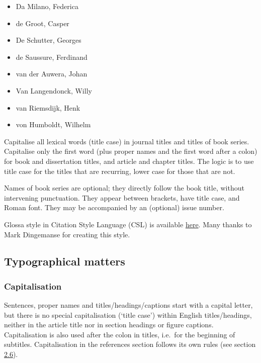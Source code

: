 \documentclass[]{glossa}
\begin{document}
\begin{itemize}
\item
  Da Milano, Federica
\item
  de Groot, Casper
\item
  De Schutter, Georges
\item
  de Saussure, Ferdinand
\item
  van der Auwera, Johan
\item
  Van Langendonck, Willy
\item
  van Riemsdijk, Henk
\item
  von Humboldt, Wilhelm
\end{itemize}

Capitalise all lexical words (title case) in journal titles and titles
of book series. Capitalise only the first word (plus proper names and
the first word after a colon) for book and dissertation titles, and
article and chapter titles. The logic is to use title case for the
titles that are recurring, lower case for those that are not.

Names of book series are optional; they directly follow the book title,
without intervening punctuation. They appear between brackets, have
title case, and Roman font. They may be accompanied by an (optional)
issue number.

Glossa style in Citation Style Language (CSL) is available
\href{https://www.zotero.org/styles?q=Glossa}{here}. Many thanks to Mark
Dingemanse for creating this style.

\hypertarget{typographical-matters}{%
\subsection{Typographical matters}\label{typographical-matters}}

\hypertarget{capitalisation}{%
\subsubsection{Capitalisation}\label{capitalisation}}

Sentences, proper names and titles/headings/captions start with a
capital letter, but there is no special capitalisation (`title case')
within English titles/headings, neither in the article title nor in
section headings or figure captions. Capitalisation is also used after
the colon in titles, i.e.~for the beginning of subtitles. Capitalisation
in the references section follows its own rules (see section
\protect\hyperlink{sec:refs}{2.6}).
\end{document}
